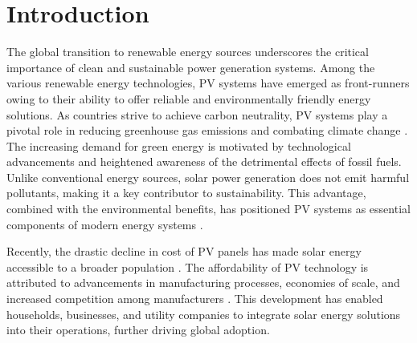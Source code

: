 \documentclass[preprint,12pt]{elsarticle}
\begin{document}
\section{Introduction}
\label{sec1}
The global transition to renewable energy sources underscores the critical importance of clean and sustainable power generation systems. Among the various renewable energy technologies, PV systems have emerged as front-runners owing to their ability to offer reliable and environmentally friendly energy solutions. As countries strive to achieve carbon neutrality, PV systems play a pivotal role in reducing greenhouse gas emissions and combating climate change \cite{esram2007comparison}. The increasing demand for green energy is motivated by technological advancements and heightened awareness of the detrimental effects of fossil fuels. Unlike conventional energy sources, solar power generation does not emit harmful pollutants, making it a key contributor to sustainability. This advantage, combined with the environmental benefits, has positioned PV systems as essential components of modern energy systems \cite{saleh2024challenges}.

Recently, the drastic decline in cost of PV panels has made solar energy accessible to a broader population \cite{nikolina2016international,khan2024economics}. The affordability of PV technology is attributed to advancements in manufacturing processes, economies of scale, and increased competition among manufacturers \cite{esram2007comparison}. This development has enabled households, businesses, and utility companies to integrate solar energy solutions into their operations, further driving global adoption. 
\end{document}
